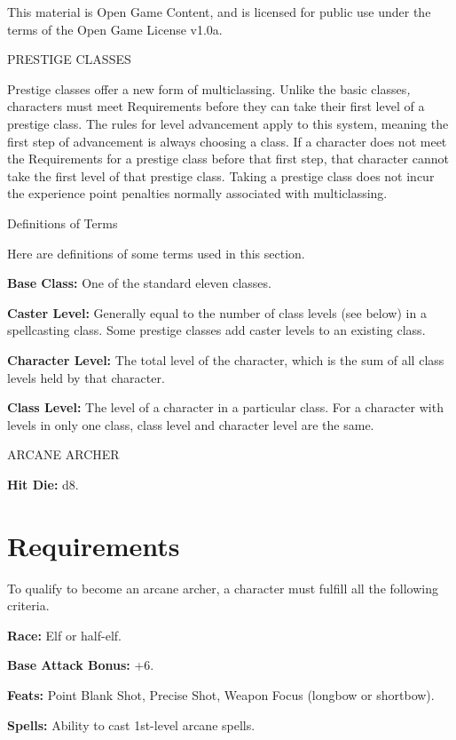 \documentclass{article}
\begin{document}
This material is Open Game Content, and is licensed for public use under the terms 
of the Open Game License v1.0a.

{\LARGE{}PRESTIGE CLASSES}

\vspace{12pt}
Prestige classes offer a new form of multiclassing. Unlike the basic classes\textit{, 
}characters must meet Requirements before they can take their first level of a 
prestige class. The rules for level advancement apply to this system, meaning the 
first step of advancement is always choosing a class. If a character does not meet 
the Requirements for a prestige class before that first step, that character cannot 
take the first level of that prestige class.  Taking a prestige class does not 
incur the experience point penalties normally associated with multiclassing.

\vspace{12pt}
Definitions of Terms

Here are definitions of some terms used in this section.

\textbf{Base Class:} One of the standard eleven classes.

\textbf{Caster Level:} Generally equal to the number of class levels (see below) 
in a spellcasting class. Some prestige classes add caster levels to an existing 
class.

\textbf{Character Level:} The total level of the character, which is the sum of 
all class levels held by that character.

\textbf{Class Level:} The level of a character in a particular class. For a character 
with levels in only one class, class level and character level are the same.

\vspace{12pt}
ARCANE ARCHER

\textbf{Hit Die:} d8.

\section*{\textbf{Requirements}}

To qualify to become an arcane archer, a character must fulfill all the following 
criteria.

\textbf{Race:} Elf or half-elf.

\textbf{Base Attack Bonus:} +6.

\textbf{Feats:} Point Blank Shot, Precise Shot, Weapon Focus (longbow or shortbow).

\textbf{Spells:} Ability to cast 1st-level arcane spells.
\end{document}
